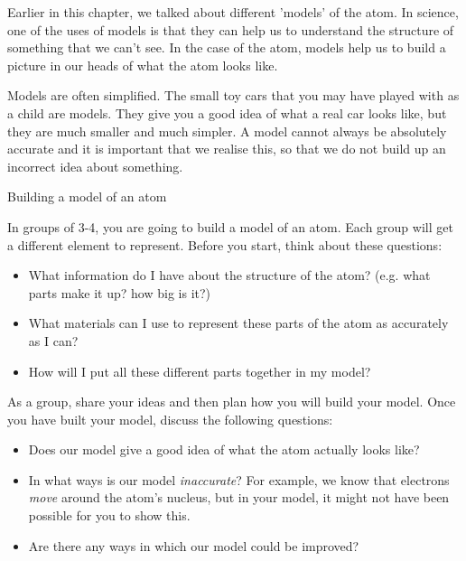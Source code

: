             \label{m38741*id260472}Earlier in this chapter, we talked about different 'models' of the atom. In science, one of the uses of models is that they can help us to understand the structure of something that we can't see. In the case of the atom, models help us to build a picture in our heads of what the atom looks like.\par 
        \label{m38741*id260480}Models are often simplified. The small toy cars that you may have played with as a child are models. They give you a good idea of what a real car looks like, but they are much smaller and much simpler. A model cannot always be absolutely accurate and it is important that we realise this, so that we do not build up an incorrect idea about something.\par 
\begin{groupdiscussion}{Building a model of an atom }
            \nopagebreak
\begin{multicols}{2}
        \label{m38741*id260488}In groups of 3-4, you are going to build a model of an atom. Each group will get a different element to represent. Before you start, think about these questions: 
        \label{m38741*id260495}\begin{itemize}[noitemsep]
            \label{m38741*uid114}\item What information do I have about the structure of the atom? (e.g. what parts make it up? how big is it?)
\label{m38741*uid115}\item What materials can I use to represent these parts of the atom as accurately as I can?
\label{m38741*uid116}\item How will I put all these different parts together in my model?
\end{itemize}
        \label{m38741*id260537}As a group, share your ideas and then plan how you will build your model. Once you have built your model, discuss the following questions: 
        \label{m38741*id260542}\begin{itemize}[noitemsep]
            \label{m38741*uid117}\item Does our model give a good idea of what the atom actually looks like?
\label{m38741*uid118}\item In what ways is our model \textsl{inaccurate}? For example, we know that electrons \textsl{move} around the atom's nucleus, but in your model, it might not have been possible for you to show this.
\label{m38741*uid119}\item Are there any ways in which our model could be improved?

\end{itemize}
\end{multicols}
\end{groupdiscussion}
